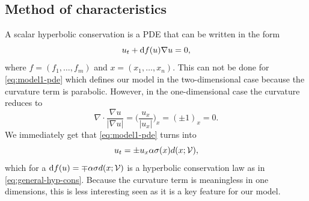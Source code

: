\subsection*{Method of characteristics}
A scalar hyperbolic conservation is a PDE that can be written in the form 
\begin{equation}
    u_t + \mathop{}\!\mathrm{d} f(u) \nabla u = 0,
    \label{eq:general-hyp-cons}
\end{equation}
where $f=(f_1,\dots, f_m)$ and $x=(x_1, \dots, x_n)$\cite{MR3443431}. This can not be done for \eqref{eq:model1-pde} which defines our model in the two-dimensional case because the curvature term is parabolic. However, in the one-dimensional case the curvature reduces to
\begin{equation*}
    \nabla \cdot \frac{\nabla u}{|\nabla u|} = \bigg( \frac{u_x}{|u_x|} \bigg)_x = (\pm 1)_x = 0.
\end{equation*}
We immediately get that \eqref{eq:model1-pde} turns into
\begin{equation*}
    u_t = \pm u_x \alpha \sigma(x) d(x; \mathcal{V}),
\end{equation*}
which for a $\mathop{}\!\mathrm{d} f(u) = \mp \alpha \sigma d(x; \mathcal{V})$ is a hyperbolic conservation law as in \eqref{eq:general-hyp-cons}. Because the curvature term is meaningless in one dimensions, this is less interesting seen as it is a key feature for our model. 

